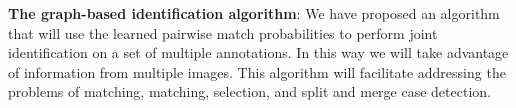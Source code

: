 \begin{itemln}

           \item \textbf{The graph-based identification algorithm}:
                We have proposed an algorithm that will use the learned pairwise match probabilities to perform
                joint identification on a set of multiple annotations. In this way we will take advantage of
                information from multiple images. This algorithm will facilitate addressing the problems of
                \intraoccurrence{} matching, \vsexemplar{} matching, \exemplar{} selection, and split and merge
                case detection.

      \end{itemln}






